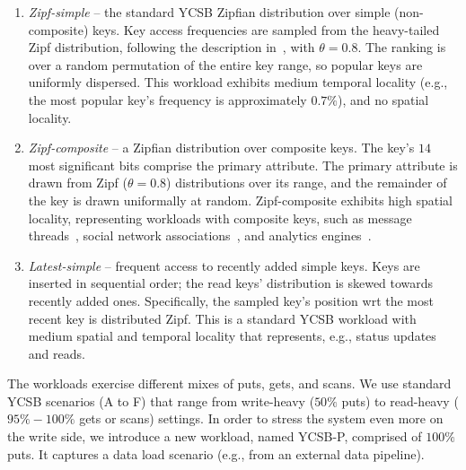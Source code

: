 \begin{enumerate}
\item {\em Zipf-simple} -- the standard YCSB Zipfian distribution over simple (non-composite) keys. 
Key access frequencies are sampled from the heavy-tailed Zipf distribution, 
following the description in~\cite{Gray:1994:QGB:191839.191886}, with $\theta = 0.8$. 
The ranking is over a random permutation of the entire key range, so popular keys are uniformly dispersed.
This workload exhibits 
medium temporal locality (e.g., the most popular key's frequency is approximately $0.7\%$), 
and no spatial locality. 

\item {\em Zipf-composite}  -- a Zipfian distribution over composite keys. 
The key's $14$ most significant bits comprise the primary attribute. 
The primary attribute is drawn from Zipf ($\theta=0.8$) distributions over its range, and  the remainder of the key is drawn uniformally at random.
Zipf-composite exhibits high spatial locality, representing workloads 
with composite keys, such as message threads~\cite{Borthakur:2011:AHG:1989323.1989438},
social network associations~\cite{Armstrong:2013:LDB:2463676.2465296}, and analytics engines~\cite{flurry}. 

\item {\em Latest-simple} -- frequent access to recently added simple keys. 
Keys are inserted in sequential  order; the read keys' distribution is skewed towards recently added ones. 
Specifically, the sampled key's position wrt the most recent key is distributed Zipf. This is a 
standard YCSB workload with medium spatial and temporal locality that represents, e.g., status updates and reads. 
\end{enumerate}

The workloads exercise different mixes of puts, gets, and scans. We use standard YCSB scenarios 
(A to F) that range from write-heavy ($50\%$ puts) to read-heavy ($95\%-100\%$ gets or scans) settings. 
In order to stress the system even more on the write side, we introduce a new workload, named 
YCSB-P, comprised of $100\%$ puts. It captures a data load scenario (e.g., from an 
external data pipeline). 

